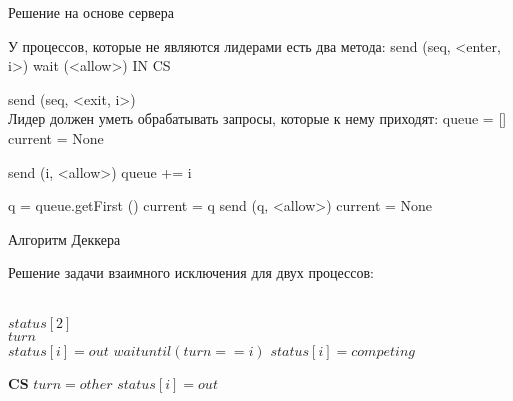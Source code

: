 \begin{algorithm}
\caption{Решение на основе сервера}
\label{algServer}
\begin{algorithmic}
\State У процессов, которые не являются лидерами есть два метода:
 
  \State send (seq, <enter, i>)  
  \State wait (<allow>) 
  \State IN CS 
\EndProcedure

  \State send (seq, <exit, i>) 
\EndProcedure
\\
\State Лидер должен уметь обрабатывать запросы, которые к нему приходят:
  
  \State queue = []
  \State current = None 
\EndProcedure

 
    \State send (i, <allow>) 
  \Else
    \State queue += i
  \EndIf  
\EndProcedure

  
    \State q = queue.getFirst ()
    \State current = q
    \State send (q, <allow>)
  \Else
     \State current = None
  \EndIf
\EndProcedure


\end{algorithmic}
\end{algorithm}

\begin{algorithm}
\caption{Алгоритм Деккера}
Решение задачи взаимного исключения для двух процессов: 
\label{algDekker}
\begin{algorithmic}
\Ensure \\$status[2]$ \\ 
$turn$ \\ 
    \State $status[i] = out$
    \State $wait until (turn == i)$
    \State $status[i] = competing$
  \EndIf
\EndWhile

\State \textbf{CS}
\State $turn = other$
\State $status[i] = out$
\end{algorithmic}
\end{algorithm}


